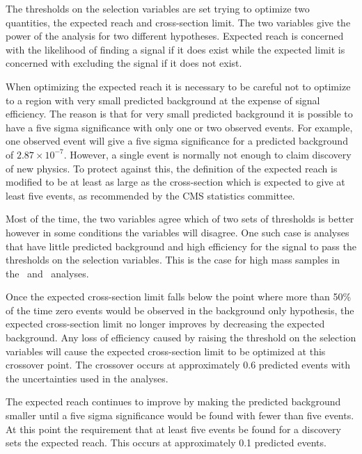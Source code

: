 The thresholds on the selection variables are set trying to optimize two quantities, the expected reach and cross-section limit.
The two variables give the power of the analysis for two different hypotheses. Expected reach is concerned with the likelihood of finding a signal if it does exist while the
expected limit is concerned with excluding the signal if it does not exist.

When optimizing the expected reach it is necessary to be careful not to optimize to
a region with very small predicted background at the expense of signal efficiency. 
The reason is that for very small predicted background it is possible to have a five sigma
significance with only one or two observed events. For example, one observed event will give a five sigma significance for a predicted background of $2.87\times10^{-7}$.
However, a single event is normally not enough to claim discovery of new physics.
To protect against this, the definition of the expected reach is modified to be at least as large as
the cross-section which is expected to give at least five events, as recommended by the CMS statistics committee.

Most of the time, the two variables agree which of two sets of thresholds is better however in some
conditions the variables will disagree. One such case is analyses that have little predicted background and high efficiency for the signal to pass the thresholds on the
selection variables. This is the case for high mass samples in the \tktof\  and \tkonly\ analyses.

Once the expected cross-section limit falls below the point where more than 50\% of the time zero events would be observed in the background only hypothesis,
the expected cross-section limit no longer improves
by decreasing the expected background. Any loss of efficiency caused by raising the threshold on the selection variables will cause the expected cross-section limit to be optimized
at this crossover point. The crossover occurs at approximately 0.6 predicted events with the uncertainties used in the analyses. 

The expected reach continues to improve by making the predicted background smaller until a five sigma significance would be found with fewer than five events. At this
point the requirement that at least five events be found for a discovery sets the expected reach.
This occurs at approximately 0.1 predicted events. 

